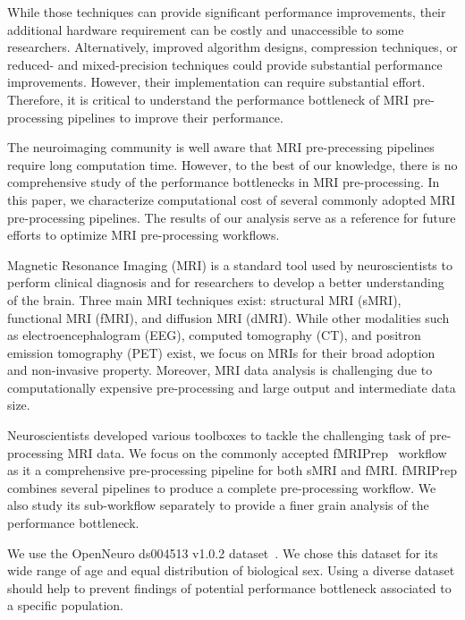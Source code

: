 \documentclass[conference]{IEEEtran}
\begin{document}
While those techniques can provide significant performance improvements, their additional hardware requirement can be costly and unaccessible to some researchers. Alternatively, improved algorithm designs, compression techniques, or reduced- and mixed-precision techniques could provide substantial performance improvements. However, their implementation can require substantial effort. Therefore, it is critical to understand the performance bottleneck of MRI pre-processing pipelines to improve their performance.

The neuroimaging community is well aware that MRI pre-precessing pipelines require long computation time. However, to the best of our knowledge, there is no comprehensive study of the performance bottlenecks in MRI pre-processing. In this paper, we characterize computational cost of several commonly adopted MRI pre-processing pipelines. The results of our analysis serve as a reference for future efforts to optimize MRI pre-processing workflows.

Magnetic Resonance Imaging (MRI) is a standard tool used by neuroscientists to perform clinical diagnosis and for researchers to develop a better understanding of the brain. Three main MRI techniques exist: structural MRI (sMRI), functional MRI (fMRI), and diffusion MRI (dMRI). While other modalities such as electroencephalogram (EEG), computed tomography (CT), and positron emission tomography (PET) exist, we focus on MRIs for their broad adoption and non-invasive property. Moreover, MRI data analysis is challenging due to computationally expensive pre-processing and large output and intermediate data size.

Neuroscientists developed various toolboxes to tackle the challenging task of pre-processing MRI data. We focus on the commonly accepted fMRIPrep~\cite{Esteban2019-bl} workflow as it a comprehensive pre-processing pipeline for both sMRI and fMRI. fMRIPrep combines several pipelines to produce a complete pre-processing workflow. We also study its sub-workflow separately to provide a finer grain analysis of the performance bottleneck.

We use the OpenNeuro ds004513 v1.0.2 dataset~\cite{ds004513:1.0.2}. We chose this dataset for its wide range of age and equal distribution of biological sex. Using a diverse dataset should help to prevent findings of potential performance bottleneck associated to a specific population.
\end{document}
